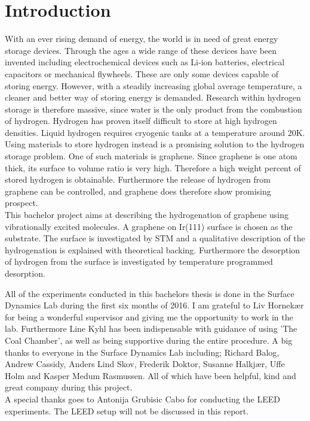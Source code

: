 \chapter{Introduction}

With an ever rising demand of energy, the world is in need of great energy storage devices. Through the ages a wide range of these devices have been invented including electrochemical devices such as Li-ion batteries, electrical capacitors or mechanical flywheels. These are only some devices capable of storing energy. However, with a steadily increasing global average temperature, a cleaner and better way of storing energy is demanded. Research within hydrogen storage is therefore massive, since water is the only product from the combustion of hydrogen. Hydrogen has proven itself difficult to store at high hydrogen densities. Liquid hydrogen requires cryogenic tanks at a temperature around 20K. Using materials to store hydrogen instead is a promising solution to the hydrogen storage problem. One of such materials is graphene. Since graphene is one atom thick, its surface to volume ratio is very high. Therefore a high weight percent of stored hydrogen is obtainable. Furthermore the release of hydrogen from graphene can be controlled, and graphene does therefore show promising prospect.\\
This bachelor project aims at describing the hydrogenation of graphene using vibrationally excited molecules. A graphene on Ir(111) surface is chosen as the substrate. The surface is investigated by STM and a qualitative description of the hydrogenation is explained with theoretical backing. Furthermore the desorption of hydrogen from the surface is investigated by temperature programmed desorption.


All of the experiments conducted in this bachelors thesis is done in the Surface Dynamics Lab during the first six months of 2016. I am grateful to Liv Hornekær for being a wonderful supervisor and giving me the opportunity to work in the lab. Furthermore Line Kyhl has been indispensable with guidance of using 'The Coal Chamber', as well as being supportive during the entire procedure. A big thanks to everyone in the Surface Dynamics Lab including; Richard Balog, Andrew Cassidy, Anders Lind Skov, Frederik Doktor, Susanne Halkjær, Uffe Holm and Kasper Medum Rasmussen. All of which have been helpful, kind and great company during this project.\\
A special thanks goes to Antonija Grubisic Cabo for conducting the LEED experiments. The LEED setup will not be discussed in this report.
